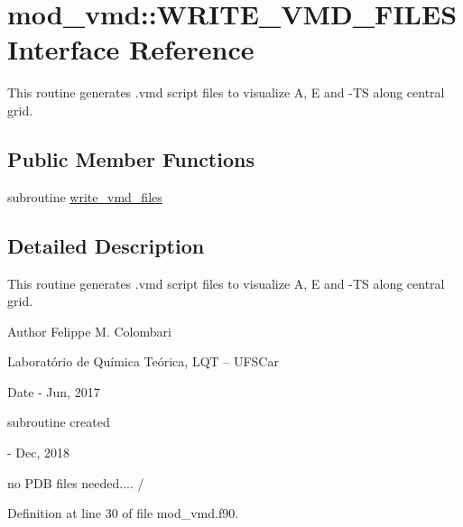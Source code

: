 \hypertarget{interfacemod__vmd_1_1WRITE__VMD__FILES}{}\section{mod\+\_\+vmd\+:\+:W\+R\+I\+T\+E\+\_\+\+V\+M\+D\+\_\+\+F\+I\+L\+ES Interface Reference}
\label{interfacemod__vmd_1_1WRITE__VMD__FILES}


This routine generates .vmd script files to visualize A, E and -\/\+TS along central grid.  


\subsection*{Public Member Functions}
\begin{DoxyCompactItemize}
\item 
subroutine \hyperlink{interfacemod__vmd_1_1WRITE__VMD__FILES_ad1dbc2549621cc00c913efdb675ab715}{write\+\_\+vmd\+\_\+files}
\end{DoxyCompactItemize}


\subsection{Detailed Description}
This routine generates .vmd script files to visualize A, E and -\/\+TS along central grid. 

\begin{DoxyAuthor}{Author}
Felippe M. Colombari
\begin{DoxyItemize}
\item Laboratório de Química Teórica, L\+QT -- U\+F\+S\+Car 
\end{DoxyItemize}
\end{DoxyAuthor}
\begin{DoxyDate}{Date}
-\/ Jun, 2017
\begin{DoxyItemize}
\item subroutine created 
\end{DoxyItemize}

-\/ Dec, 2018
\begin{DoxyItemize}
\item no P\+DB files needed.... / 
\end{DoxyItemize}
\end{DoxyDate}


Definition at line 30 of file mod\+\_\+vmd.\+f90.



